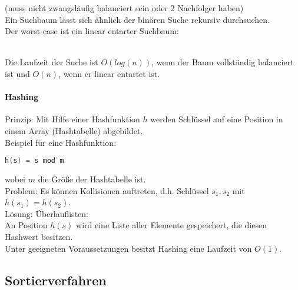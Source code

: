(muss nicht zwangsläufig balanciert sein oder 2 Nachfolger haben)\\
Ein Suchbaum lässt sich ähnlich der binären Suche rekursiv durchsuchen.\\
Der worst-case ist ein linear entarter Suchbaum:\\
\\
Die Laufzeit der Suche ist $O(log(n))$, wenn der Baum vollständig balanciert ist und $O(n)$, wenn er linear entartet ist.

\paragraph{Hashing}
Prinzip: Mit Hilfe einer Hashfunktion $h$ werden Schlüssel auf eine Position in einem Array (Hashtabelle) abgebildet.\\
Beispiel für eine Hashfunktion:
\begin{lstlisting}[language=C]
h(s) = s mod m
\end{lstlisting}
wobei $m$ die Größe der Hashtabelle ist.\\
Problem: Es können Kollisionen auftreten, d.h. Schlüssel $s_1,s_2$ mit $h(s_1)=h(s_2)$. \\
Lösung: Überlauflisten:\\
An Position $h(s)$ wird eine Liste aller Elemente gespeichert, die diesen Hashwert besitzen.\\
Unter geeigneten Voraussetzungen besitzt Hashing eine Laufzeit von $O(1)$.

\subsection{Sortierverfahren}

